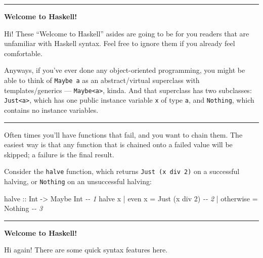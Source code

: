 \documentclass[]{article}
\newenvironment{Shaded}{}{}
\newcommand{\CommentTok}[1]{\textcolor[rgb]{0.38,0.63,0.69}{\textit{#1}}}
\newcommand{\DataTypeTok}[1]{\textcolor[rgb]{0.56,0.13,0.00}{#1}}
\newcommand{\DecValTok}[1]{\textcolor[rgb]{0.25,0.63,0.44}{#1}}
\newcommand{\FunctionTok}[1]{\textcolor[rgb]{0.02,0.16,0.49}{#1}}
\newcommand{\NormalTok}[1]{#1}
\newcommand{\OperatorTok}[1]{\textcolor[rgb]{0.40,0.40,0.40}{#1}}
\newcommand{\OtherTok}[1]{\textcolor[rgb]{0.00,0.44,0.13}{#1}}
\begin{document}
\begin{center}\rule{0.5\linewidth}{0.5pt}\end{center}

\textbf{Welcome to Haskell!}

Hi! These ``Welcome to Haskell'' asides are going to be for you readers that are
unfamiliar with Haskell syntax. Feel free to ignore them if you already feel
comfortable.

Anyways, if you've ever done any object-oriented programming, you might be able
to think of \texttt{Maybe\ a} as an abstract/virtual superclass with
templates/generics --- \texttt{Maybe\textless{}a\textgreater{}}, kinda. And that
superclass has two subclasses: \texttt{Just\textless{}a\textgreater{}}, which
has one public instance variable \texttt{x} of type \texttt{a}, and
\texttt{Nothing}, which contains no instance variables.

\begin{center}\rule{0.5\linewidth}{0.5pt}\end{center}

Often times you'll have functions that fail, and you want to chain them. The
easiest way is that any function that is chained onto a failed value will be
skipped; a failure is the final result.

Consider the \texttt{halve} function, which returns
\texttt{Just\ (x\ \textasciigrave{}div\textasciigrave{}\ 2)} on a successful
halving, or \texttt{Nothing} on an unsuccessful halving:

\begin{Shaded}
\begin{Highlighting}[]
\OtherTok{halve ::} \DataTypeTok{Int} \OtherTok{{-}\textgreater{}} \DataTypeTok{Maybe} \DataTypeTok{Int}                       \CommentTok{{-}{-} 1}
\NormalTok{halve x }\OperatorTok{|} \FunctionTok{even}\NormalTok{ x    }\OtherTok{=} \DataTypeTok{Just}\NormalTok{ (x }\OtherTok{\textasciigrave{}div\textasciigrave{}} \DecValTok{2}\NormalTok{)          }\CommentTok{{-}{-} 2}
        \OperatorTok{|} \FunctionTok{otherwise} \OtherTok{=} \DataTypeTok{Nothing}                   \CommentTok{{-}{-} 3}
\end{Highlighting}
\end{Shaded}

\begin{center}\rule{0.5\linewidth}{0.5pt}\end{center}

\textbf{Welcome to Haskell!}

Hi again! There are some quick syntax features here.
\end{document}
